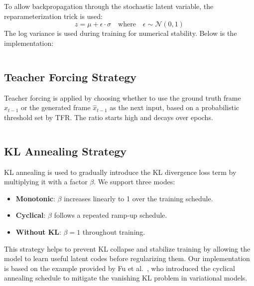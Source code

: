 To allow backpropagation through the stochastic latent variable, the reparameterization trick is used:
\[
    z = \mu + \epsilon \cdot \sigma \quad \text{where} \quad \epsilon \sim \mathcal{N}(0, 1)
\]
The log variance is used during training for numerical stability. Below is the implementation:

\inputminted[firstline=65, lastline=89, highlightlines={77-81}]{python}{../modules/modules.py}

\subsection{Teacher Forcing Strategy}

Teacher forcing is applied by choosing whether to use the ground truth frame $x_{t-1}$ or the generated frame $\hat{x}_{t-1}$ as the next input, based on a probabilistic threshold set by TFR. The ratio starts high and decays over epochs.

\inputminted[firstline=310, lastline=322]{python}{../Trainer.py}

\subsection{KL Annealing Strategy}

KL annealing is used to gradually introduce the KL divergence loss term by multiplying it with a factor $\beta$. We support three modes:
\begin{itemize}
    \item \textbf{Monotonic}: $\beta$ increases linearly to 1 over the training schedule.
    \item \textbf{Cyclical}: $\beta$ follows a repeated ramp-up schedule.
    \item \textbf{Without KL}: $\beta = 1$ throughout training.
\end{itemize}

This strategy helps to prevent KL collapse and stabilize training by allowing the model to learn useful latent codes before regularizing them. Our implementation is based on the example provided by Fu et al.~\cite{fu_cyclical_2019_naacl}, who introduced the cyclical annealing schedule to mitigate the vanishing KL problem in variational models.

\inputminted[firstline=41, lastline=78]{python}{../Trainer.py}
